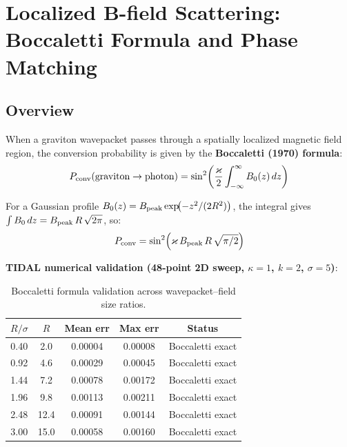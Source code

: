 
\section{Localized B-field Scattering: Boccaletti Formula and Phase Matching}
\label{sec:gertsenshtein-localized}

\subsection{Overview}

When a graviton wavepacket passes through a spatially localized magnetic field region, the
conversion probability is given by the \textbf{Boccaletti (1970) formula}:
\begin{equation}
  P_\mathrm{conv}(\text{graviton} \to \text{photon}) = \sin^2\!\left(\frac{\varkappa}{2} \int_{-\infty}^{\infty} B_0(z)\, dz\right)
  \label{eq:boccaletti}
\end{equation}

For a Gaussian profile $B_0(z) = B_\text{peak} \exp\!\bigl(-z^2/(2R^2)\bigr)$, the integral gives
$\int B_0\, dz = B_\text{peak}\, R\, \sqrt{2\pi}$, so:
\begin{equation}
  P_\mathrm{conv} = \sin^2\!\left(\varkappa\, B_\text{peak}\, R\, \sqrt{\pi/2}\right)
  \label{eq:boccaletti-gaussian}
\end{equation}

\textbf{TIDAL numerical validation (48-point 2D sweep, $\kappa=1$, $k=2$, $\sigma=5$)}:

\begin{table}[htbp]
\centering
\caption{Boccaletti formula validation across wavepacket--field size ratios.}
\label{tab:boccaletti-sweep}
\begin{tabular}{@{}ccccc@{}}
\toprule
$R/\sigma$ & $R$ & Mean err & Max err & Status \\
\midrule
0.40 & 2.0  & 0.00004 & 0.00008 & Boccaletti exact \\
0.92 & 4.6  & 0.00029 & 0.00045 & Boccaletti exact \\
1.44 & 7.2  & 0.00078 & 0.00172 & Boccaletti exact \\
1.96 & 9.8  & 0.00113 & 0.00211 & Boccaletti exact \\
2.48 & 12.4 & 0.00091 & 0.00144 & Boccaletti exact \\
3.00 & 15.0 & 0.00058 & 0.00160 & Boccaletti exact \\
\bottomrule
\end{tabular}
\end{table}

